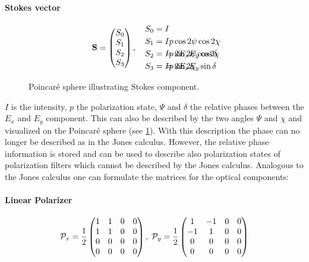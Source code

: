 \paragraph{Stokes vector}
\begin{align}
% 
\vec{S} =
\begin{pmatrix} S_0 \\ S_1 \\ S_2 \\ S_3\end{pmatrix} , \quad
% 
\begin{split}
S_0 &= I \\
S_1 &= I p \cos 2\psi \cos 2\chi \\
S_2 &= I p \sin 2\psi \cos 2\chi \\
S_3 &= I p \sin 2\chi
\end{split}
% 
\hspace{-7em}
% 
\begin{split}
& \\
& \\
&= 2 E_x E_y \cos \delta \\
&= 2 E_x E_y \sin \delta
\end{split}
\end{align}
%
\begin{figure}[!t]
\centering
{}
\caption{Poincar\'{e} sphere illustrating Stokes component.}
\label{fig:stokesPoincare}
\end{figure}
%
$I$ is the intensity, $p$ the polarization state, $\Psi$ and $\delta$ the relative phases between the $E_x$ and $E_y$ component.
This can also be described by the two angles $\Psi$ and $\chi$ and visualized on the Poincar\'{e} sphere (see \cref{fig:stokesPoincare}).
With this description the phase can no longer be described as in the Jones calculus.
However, the relative phase information is stored and can be used to describe also polarization states of polarization filters which cannot be described by the Jones calculus.
Analogous to the Jones calculus one can formulate the matrices for the optical components:
%
\paragraph{Linear Polarizer}
\begin{align}
\mathcal{P}_x=\frac{1}{2}
\begin{pmatrix}
    1 & 1 & 0 & 0 \\
    1 & 1 & 0 & 0 \\
    0 & 0 & 0 & 0 \\
    0 & 0 & 0 & 0
  \end{pmatrix}
, \;
\mathcal{P}_y=\frac{1}{2}
\begin{pmatrix}
     1 & -1 & 0 & 0 \\
    -1 &  1 & 0 & 0 \\
     0 &  0 & 0 & 0 \\
     0 &  0 & 0 & 0
\end{pmatrix}
\end{align}
%
